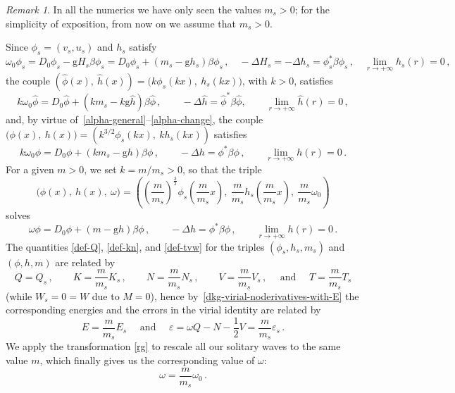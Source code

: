 \documentclass[12pt]{extarticle}
\newcommand{\coupling}{\mathrm{g}}
\theoremstyle{plain}
\theoremstyle{remark}
\newtheorem{remark}[lemma]{Remark}
\begin{document}
\begin{remark}
In all the numerics we have only
seen the values $m_s>0$;
for the simplicity of exposition, 
from now on we assume that
$m_s>0$.
\end{remark}

Since
$\phi_s=(v_s, u_s)$ and $h_s$
satisfy
\[
\omega_0\phi_s
=D_0\phi_s-\coupling H_s\beta\phi_s
=D_0\phi_s+(m_s-\coupling h_s)\beta\phi_s\,,
\quad
-\Delta H_s=-\Delta h_s=\phi_s^*\beta\phi_s\,,
\quad
\lim_{r\to+\infty}h_s(r)=0\,,
\]
the couple
$(\hat\phi(x),\ \hat h(x))
=\bigl(k\phi_s(k x),\ h_s(k x)\bigr)$,
with $k>0$,
satisfies
\[
k\omega_0 \hat\phi
= D_0\hat\phi
+(km_s - k\coupling \hat{h}) \beta\hat\phi\,,
\qquad
-\Delta \hat{h}=\hat\phi^*\beta\hat\phi,
\qquad
\lim_{r\to+\infty}\hat h(r)=0\,,
\]
and, by virtue of~\eqref{alpha-general}--\eqref{alpha-change},
the couple
$(\phi(x),\  h(x)\bigr)
= \left(k^{3/2}\phi_s(k x),\ k h_s(k x)\right)$
satisfies
\[
k\omega_0\phi = D_0\phi + \left( k m_s - \coupling h \right) \beta\phi\,,
\qquad
-\Delta h = \phi^*\beta\phi\,,
\qquad
\lim_{r\to+\infty}h(r)=0\,.
\]
For a given $m>0$,
we set $k = m/m_s>0$, so that the triple
\begin{equation}\label{rg}
\bigl(\phi(x),\ h(x),\ \omega\bigr)
=
\left(
\left(\frac{m}{m_s}\right)^{\frac{3}{2}} \phi_s\left(\frac{m}{m_s} x \right),
\ \frac{m}{m_s} h_s\left(\frac{m}{m_s} x \right),
\ \frac{m}{m_s}\omega_0
\right)
\end{equation}
solves
\[
\omega \phi = D_0\phi
+ (m-\coupling h)\beta\phi\,,
\qquad
-\Delta h = \phi^*\beta\phi\,,
\qquad
\lim_{r\to+\infty}h(r)=0\,.
\]
The quantities
\eqref{def-Q},
\eqref{def-kn}, and
\eqref{def-tvw}
for the triples
$(\phi_s,h_s,m_s)$
and
$(\phi,h,m)$
are related by
\[
Q = Q_s\,,
\qquad
K = \frac{m}{m_s} K_s\,,
\qquad
N = \frac{m}{m_s} N_s\,,
\qquad
V = \frac{m}{m_s} V_s\,,
\quad\text{ and } \quad
T = \frac{m}{m_s} T_s
\]
(while $W_s = 0 = W$ due to $M=0$),
hence
by~\eqref{dkg-virial-noderivatives-with-E}
the corresponding
energies and the errors in the
virial identity
are related by
\[
    E = \frac{m}{m_s} E_s
    \quad \text{ and } \quad
    \varepsilon
    =
    \omega Q
    - N - \frac{1}{2} V
    =\frac{m}{m_s}\varepsilon_s\,.
\]
We apply the transformation \eqref{rg}
to rescale all our solitary waves
to the same value $m$,
which finally gives us the corresponding value of $\omega$:
\begin{equation}\label{def-new-omega}
\omega=\frac{m}{m_s}\omega_0\,.
\end{equation}
\end{document}
